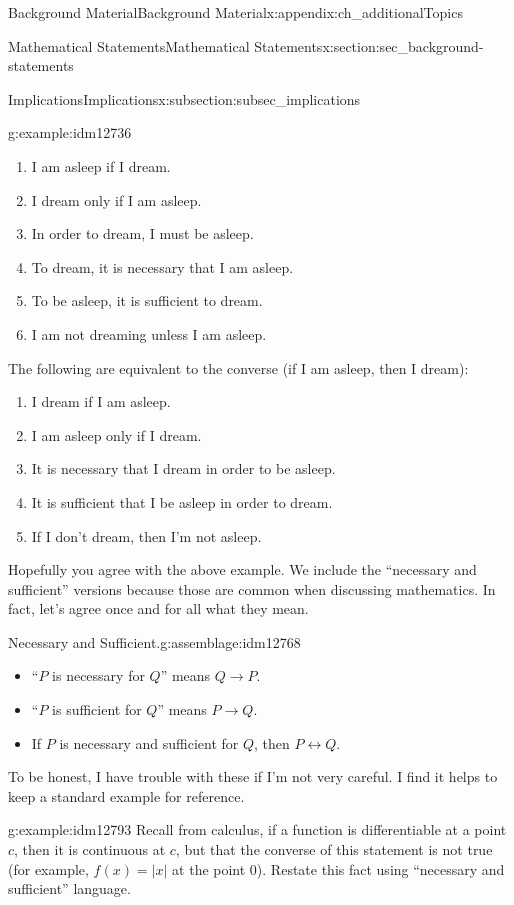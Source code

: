 \documentclass[oneside,10pt,]{book}
\numberwithin{equation}{chapter}
\def\iff{\leftrightarrow}
\def\imp{\rightarrow}
\begin{document}
\begin{appendixptx}{Background Material}{}{Background Material}{}{}{x:appendix:ch_additionalTopics}
\begin{sectionptx}{Mathematical Statements}{}{Mathematical Statements}{}{}{x:section:sec_background-statements}
\begin{subsectionptx}{Implications}{}{Implications}{}{}{x:subsection:subsec_implications}
\begin{example}{}{g:example:idm12736}
\begin{enumerate}
\item{}I am asleep if I dream.%
\item{}I dream only if I am asleep.%
\item{}In order to dream, I must be asleep.%
\item{}To dream, it is necessary that I am asleep.%
\item{}To be asleep, it is sufficient to dream.%
\item{}I am not dreaming unless I am asleep.%
\end{enumerate}
The following are equivalent to the converse (if I am asleep, then I dream):%
\begin{enumerate}
\item{}I dream if I am asleep.%
\item{}I am asleep only if I dream.%
\item{}It is necessary that I dream in order to be asleep.%
\item{}It is sufficient that I be asleep in order to dream.%
\item{}If I don't dream, then I'm not asleep.%
\end{enumerate}
%
\end{example}
Hopefully you agree with the above example. We include the ``necessary and sufficient'' versions because those are common when discussing mathematics. In fact, let's agree once and for all what they mean.%
\begin{assemblage}{Necessary and Sufficient.}{g:assemblage:idm12768}%
\par
%
\begin{itemize}[label=\textbullet]
\item{}``\(P\) is necessary for \(Q\)'' means \(Q \imp P\).%
\item{}``\(P\) is sufficient for \(Q\)'' means \(P \imp Q\).%
\item{}If \(P\) is necessary and sufficient for \(Q\), then \(P \iff Q\).%
\end{itemize}
%
\end{assemblage}
To be honest, I have trouble with these if I'm not very careful. I find it helps to keep a standard example for reference.%
\begin{example}{}{g:example:idm12793}%
Recall from calculus, if a function is differentiable at a point \(c\), then it is continuous at \(c\), but that the converse of this statement is not true (for example, \(f(x) = |x|\) at the point 0). Restate this fact using ``necessary and sufficient'' language.%

\end{example}
\end{subsectionptx}
\end{sectionptx}
\end{appendixptx}
\end{document}
